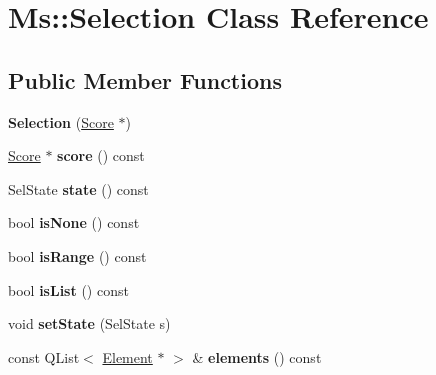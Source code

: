 \hypertarget{class_ms_1_1_selection}{}\section{Ms\+:\+:Selection Class Reference}
\label{class_ms_1_1_selection}
\subsection*{Public Member Functions}
\begin{DoxyCompactItemize}
\item 
\mbox{\label{class_ms_1_1_selection_a3e33c57dcd8e3286844a5368eaa4657f}} 
{\bfseries Selection} (\hyperlink{class_ms_1_1_score}{Score} $\ast$)
\item 
\mbox{\label{class_ms_1_1_selection_aaf60e2eddd577356a7e4c3d946c9286d}} 
\hyperlink{class_ms_1_1_score}{Score} $\ast$ {\bfseries score} () const
\item 
\mbox{\label{class_ms_1_1_selection_a0f0ff9623827b0e90b83689c48b8cc73}} 
Sel\+State {\bfseries state} () const
\item 
\mbox{\label{class_ms_1_1_selection_a8650b7ef69146f6deac52702bab386aa}} 
bool {\bfseries is\+None} () const
\item 
\mbox{\label{class_ms_1_1_selection_a884ac586a99a211a55eab115a2c3d95f}} 
bool {\bfseries is\+Range} () const
\item 
\mbox{\label{class_ms_1_1_selection_ad758bc5c1eadc3b1d99b4a79f07f60cb}} 
bool {\bfseries is\+List} () const
\item 
\mbox{\label{class_ms_1_1_selection_a357b80ea008a6937267c989ea145e809}} 
void {\bfseries set\+State} (Sel\+State s)
\item 
\mbox{\label{class_ms_1_1_selection_aabf6157f4dbda5a9b86a9c4cae8c167f}} 
const Q\+List$<$ \hyperlink{class_ms_1_1_element}{Element} $\ast$ $>$ \& {\bfseries elements} () const
\item 
\mbox{\label{class_ms_1_1_selection_ac9ee8665c5c05a34dbb78a09d8b3d2f2}} 

\end{DoxyCompactItemize}
